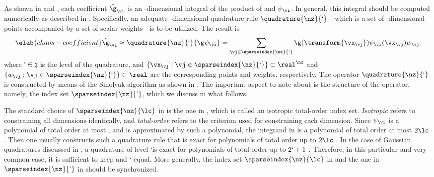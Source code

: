 As shown in  and , each
coefficient $\hat{\g}_{\vi}$ is an \nz-dimensional integral of the product of \g
and $\psi_{\vi}$. In general, this integral should be computed numerically as
described in . Specifically, an adequate
\nz-dimensional quadrature rule $\quadrature{\nz}{\lq}$---which is a set of
\nz-dimensional points accompanied by a set of scalar weights---is to be
utilized. The result is
\begin{equation} \elab{chaos-coefficient}
  \hat{\g}_{\vi} \approx \quadrature{\nz}{\lq}{\g \psi_{\vi}}
  = \sum_{\vj \in \sparseindex{\nz}{\lq}} \g(\transform{\vx_{\vj}}) \psi_{\vi}(\vx_{\vj}) w_{\vj}
\end{equation}
where $\lq \in \natural$ is the level of the quadrature, and $\{ \vx_{\vj}: \vj
\in \sparseindex{\nz}{\lq} \} \subset \real^\nz$ and $\{ w_{\vj}: \vj \in
\sparseindex{\nz}{\lq}  \} \subset \real$ are the corresponding points and
weights, respectively. The operator $\quadrature{\nz}{\lq}$ is constructed by
means of the Smolyak algorithm \cite{smolyak1963} as shown in
. The important aspect to note about
 is the structure of the operator, namely, the index
set $\sparseindex{\nz}{\lq}$, which we discuss in what follows.

The standard choice of $\sparseindex{\nz}{\lc}$ in  is the
one in , which is called an isotropic
total-order index set. \emph{Isotropic} refers to constraining all dimensions
identically, and \emph{total-order} refers to the criterion used for
constraining each dimension. Since $\psi_{\vi}$ is a polynomial of total order
at most \lc, and \g is approximated by such a polynomial, the integrand in
 is a polynomial of total order at most $2 \lc$. Then
one usually constructs such a quadrature rule that is exact for polynomials of
total order up to $2 \lc$ \cite{eldred2008}. In the case of Gaussian quadratures
discussed in , a quadrature of level \lq is exact for
polynomials of total order up to $2 \lq + 1$ \cite{heiss2008}. Therefore, in
this particular and very common case, it is sufficient to keep \lc and \lq
equal. More generally, the index set $\sparseindex{\nz}{\lc}$ in
 and the one in $\sparseindex{\nz}{\lq}$ in
 should be synchronized.

